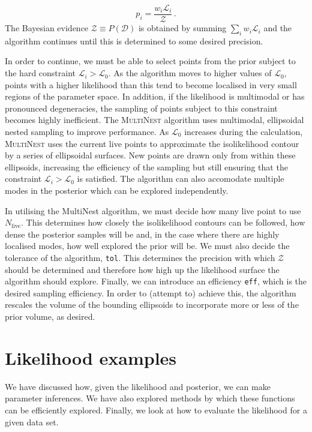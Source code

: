 \begin{equation}
p_i = \frac{w_i \mathcal{L}_i}{\mathcal{Z}}\,.
\end{equation}
The Bayesian evidence $\mathcal{Z} \equiv P(\mathcal{D})$ is obtained by summing $\sum_i w_i \mathcal{L}_i$ and the algorithm continues until this is determined to some desired precision.

In order to continue, we must be able to select points from the prior subject to the hard constraint $\mathcal{L}_i > \mathcal{L}_0$. As the algorithm moves to higher values of $\mathcal{L}_0$, points with a higher likelihood than this tend to become localised in very small regions of the parameter space. In addition, if the likelihood is multimodal or has pronounced degeneracies, the sampling of points subject to this constraint becomes highly inefficient. The \textsc{MultiNest} algorithm \cite{Feroz:2007,Feroz:2008,Feroz:2014} uses multimodal, ellipsoidal nested sampling to improve performance. As $\mathcal{L}_0$ increases during the calculation,  \textsc{MultiNest} uses the current live points to approximate the isolikelihood contour by a series of ellipsoidal surfaces. New points are drawn only from within these ellipsoids, increasing the efficiency of the sampling but still ensuring that the constraint $\mathcal{L}_i > \mathcal{L}_0$ is satisfied. The algorithm can also accomodate multiple modes in the posterior which can be explored independently.

In utilising the MultiNest algorithm, we must decide how many live point to use $N_\textrm{live}$. This determines how closely the isolikelihood contours can be followed, how dense the posterior samples will be and, in the case where there are highly localised modes, how well explored the prior will be. We must also decide the tolerance of the algorithm, \texttt{tol}. This determines the precision with which $\mathcal{Z}$ should be determined and therefore how high up the likelihood surface the algorithm should explore. Finally, we can introduce an efficiency \texttt{eff}, which is the desired sampling efficiency. In order to (attempt to) achieve this, the algorithm rescales the volume of the bounding ellipsoids to incorporate more or less of the prior volume, as desired. 

\section{Likelihood examples}

We have discussed how, given the likelihood and posterior, we can make parameter inferences. We have also explored methods by which these functions can be efficiently explored. Finally, we look at how to evaluate the likelihood for a given data set. 

